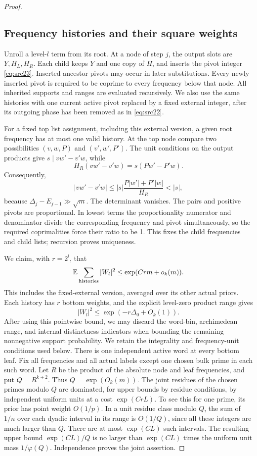 \begin{proof}
\subsection*{Frequency histories and their square weights}

Unroll a level-\(l\) term from its root. At a node of step \(j\),
the output slots are \(Y,H_L,H_R\). Each child keeps \(Y\) and
one copy of \(H\), and inserts the pivot integer
\eqref{eq:src23}. Inserted ancestor pivots may occur in later
substitutions. Every newly inserted pivot is required to be
coprime to every frequency below that node. All inherited
supports and ranges are evaluated recursively. We also use the
same histories with one current active pivot replaced by a
fixed external integer, after its outgoing phase has been
removed as in \eqref{eq:src22}.

For a fixed top list assignment, including this external
version, a given root frequency has at most one valid history.
At the top node compare two possibilities
\((v,w,P)\) and \((v',w',P')\). The unit conditions on the
output products give \(s\mid vw'-v'w\), while
\[
 H_R(vw'-v'w)=s(Pw'-P'w).
\]
Consequently,
\[
 |vw'-v'w|
 \le |s|\frac{P|w'|+P'|w|}{H_R}<|s|,
\]
because \(\Delta_j-E_{j-1}\gg\sqrt m\).
The determinant vanishes. The pairs and positive pivots are
proportional. In lowest terms the proportionality numerator
and denominator divide the corresponding frequency and pivot
simultaneously, so the required coprimalities force their ratio
to be 1. This fixes the child frequencies and child lists;
recursion proves uniqueness.

We claim, with \(r=2^l\), that
\begin{equation}\label{eq:src25}
 \mathbb E\sum_{\rm histories}|W_l|^2
       \le \exp(Crm+o_k(m)).
\end{equation}
This includes the fixed-external version, averaged over its
other actual priors. Each history has \(r\) bottom weights,
and the explicit level-zero product range gives
\[
 |W_l|^2\le\exp(-r\Delta_0+O_k(1)).
\]
After using this pointwise bound, we may discard the word-bin,
archimedean range, and internal distinctness indicators when
bounding the remaining nonnegative support probability. We retain
the integrality and frequency-unit conditions used below.
There is one independent active word at every bottom leaf.
Fix all frequencies and all actual labels except one chosen
bulk prime in each such word. Let \(R\) be the product of the
absolute node and leaf frequencies, and put
\(Q=R^{k+2}\). Thus \(Q=\exp(O_k(m))\).
The joint residues of the chosen primes modulo \(Q\) are
dominated, for upper bounds by residue conditions, by
independent uniform units at a cost \(\exp(CrL)\).
To see this for one prime, its prior has point weight \(O(1/p)\).
In a unit residue class modulo \(Q\), the sum of \(1/n\) over
each dyadic interval in its range is \(O(1/Q)\), since all these
integers are much larger than \(Q\). There are at most
\(\exp(CL)\) such intervals. The resulting upper bound
\(\exp(CL)/Q\) is no larger than \(\exp(CL)\) times the
uniform unit mass \(1/\varphi(Q)\). Independence proves
the joint assertion.


\end{proof}
